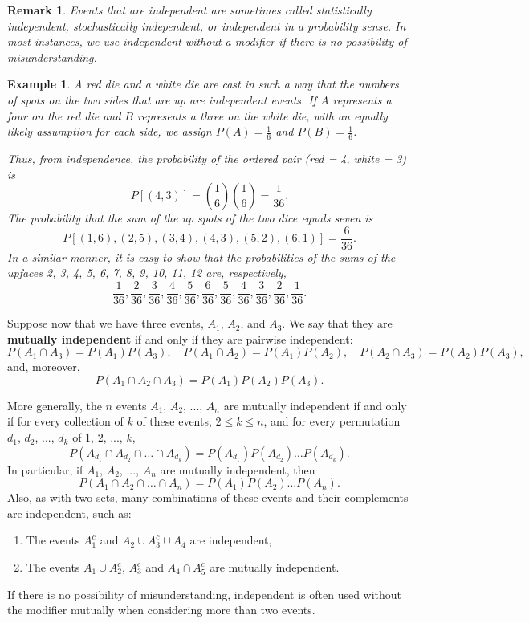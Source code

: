 \documentclass[12pt]{article}
\newtheorem{example}[theorem]{Example}
\newtheorem{remark}[theorem]{Remark}\newenvironment{Example}{\begin{example}\rm}{\end{example}}
\newcommand{\1}{{\bf 1}}
\newcommand{\2}{{\bf 2}}
\newcommand{\bld}{\textbf}
\begin{document}
\begin{remark}
Events that are independent are sometimes called statistically independent, stochastically independent, or independent in a probability sense. In most instances, we use independent without a modifier if there is no possibility of misunderstanding.
\end{remark}

\begin{example}
A red die and a white die are cast in such a way that the numbers of spots on the two sides that are up are independent events. If $A$ represents a four on the red die and $B$ represents a three on the white die, with an equally likely assumption for each side, we assign $P(A) = \frac{1}{6}$ and $P(B) = \frac{1}{6}$. 

Thus, from independence, the probability of the ordered pair (red = 4, white = 3) is
\[
P[(4, 3)] = \left(\frac{1}{6}\right)\left(\frac{1}{6}\right) = \frac{1}{36}.
\]
The probability that the sum of the up spots of the two dice equals seven is
\[
P[(1, 6), (2, 5), (3, 4), (4, 3), (5, 2), (6, 1)] = \frac{6}{36}.
\]
In a similar manner, it is easy to show that the probabilities of the sums of the upfaces 2, 3, 4, 5, 6, 7, 8, 9, 10, 11, 12 are, respectively,
\[
\frac{1}{36}, \frac{2}{36}, \frac{3}{36}, \frac{4}{36}, \frac{5}{36}, \frac{6}{36}, \frac{5}{36}, \frac{4}{36}, \frac{3}{36}, \frac{2}{36}, \frac{1}{36}.
\]
\end{example}
Suppose now that we have three events, $A_1$, $A_2$, and $A_3$. We say that they are \bld{mutually independent} if and only if they are pairwise independent:
\[
P(A_1 \cap A_3) = P(A_1)P(A_3), \quad P(A_1 \cap A_2) = P(A_1)P(A_2), \quad P(A_2 \cap A_3) = P(A_2)P(A_3),
\]
and, moreover,
\[
P(A_1 \cap A_2 \cap A_3) = P(A_1)P(A_2)P(A_3).
\]

More generally, the $n$ events $A_1$, $A_2$, ..., $A_n$ are mutually independent if and only if for every collection of $k$ of these events, $2 \leq k \leq n$, and for every permutation $d_1$, $d_2$, ..., $d_k$ of $1$, $2$, ..., $k$,
\[
P(A_{d_1} \cap A_{d_2} \cap \ldots \cap A_{d_k}) = P(A_{d_1})P(A_{d_2}) \ldots P(A_{d_k}).
\]
In particular, if $A_1$, $A_2$, ..., $A_n$ are mutually independent, then
\[
P(A_1 \cap A_2 \cap \ldots \cap A_n) = P(A_1)P(A_2) \ldots P(A_n).
\]
Also, as with two sets, many combinations of these events and their complements are independent, such as:
\begin{enumerate}
    \item The events $A_1^c$ and $A_2 \cup A_3^c \cup A_4$ are independent,
    \item The events $A_1 \cup A_2^c$, $A_3^c$ and $A_4 \cap A_5^c$ are mutually independent.
\end{enumerate}
If there is no possibility of misunderstanding, independent is often used without the modifier mutually when considering more than two events.
\end{document}

